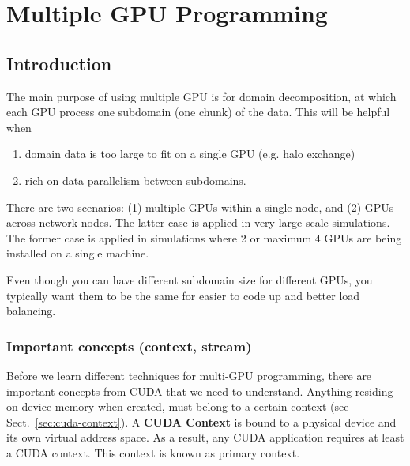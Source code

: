 \chapter{Multiple GPU Programming}
\label{chap:multiple_GPU}

\section{Introduction}
\label{sec:multi-GPU_intro}

The main purpose of using multiple GPU is for domain decomposition, at which
each GPU process one subdomain (one chunk) of the data. This will be helpful
when
\begin{enumerate}
\item domain data is too large to fit on a single GPU (e.g. halo exchange)
\item rich on data parallelism between subdomains.
\end{enumerate}
There are two scenarios: (1) multiple GPUs within a single node, and (2) GPUs
across network nodes. The latter case is applied in very large scale
simulations. The former case is applied in simulations where 2 or maximum 4 GPUs
are being installed on  a single machine. 


\begin{framed}
  Even though you can have different subdomain size for different GPUs,
  you typically want them to be the same for easier to code up and better load
  balancing. 
\end{framed}

\subsection{Important concepts (context, stream)}
\label{sec:context_stream}

Before we learn different techniques for multi-GPU programming, there are
important concepts from CUDA that we need to understand. Anything residing on
device memory when created, must belong to a certain context (see
Sect.~\ref{sec:cuda-context}). A {\bf CUDA Context} is bound to a physical
device and its own virtual address space. As a result, any CUDA application
requires at least a CUDA context. This context is known as primary context.

